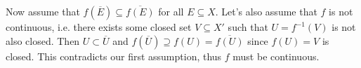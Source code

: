 \documentclass[11pt,letter]{article}
\begin{document}
\begin{enumerate}
    Now assume that $f(\overline{E}) \subseteq \overline{f(E)}$ for all $E \subseteq X$. Let's also assume that $f$ is not continuous, i.e. there exists some closed set $V \subseteq X'$ such that $U = f^{-1}(V)$ is not also closed. Then $U \subset \overline{U}$ and $f(\overline{U}) \supseteq f(U) = \overline{f(U)}$ since $f(U) = V$ is closed. This contradicts our first assumption, thus $f$ must be continuous.

\end{enumerate}
\end{document}
